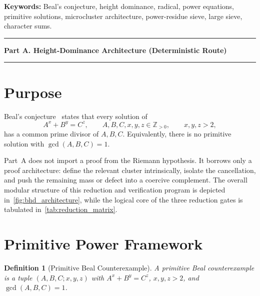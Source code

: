 \documentclass[11pt,a4paper]{article}
\newtheorem{definition}[theorem]{Definition}
\begin{document}
\begin{abstract}
Version 1.1 corrects the genus and regime classification, the null-row
direction and sieve domains, the scalar-family monodromy and strong-sum
claims, and the scope of the classical $(3,4,5)$ result. The elementary
$\Xi\ge\log4$ inequality provides no IUT/gcd bridge; historical diagnostic
scores and hard-coded gates provide no Beal exclusion. Numerical tables
remain historical diagnostics. HD3', typed transfers, explicit constants,
independent method validation and complete source/proof review remain open.
\end{abstract}

\noindent\textbf{Keywords:} Beal's conjecture, height dominance,
radical, power equations, primitive solutions, microcluster
architecture, power-residue sieve, large sieve, character sums.

\clearpage
\tableofcontents
\clearpage

\bigskip
\hrule
\medskip
\begin{center}
\textbf{Part A. Height-Dominance Architecture (Deterministic Route)}
\end{center}
\medskip
\hrule
\bigskip

\section{Purpose}

Beal's conjecture~\cite{Mauldin1997} states that every solution of
\[
  A^x + B^y = C^z,
  \qquad A,B,C,x,y,z \in \mathbb Z_{>0},
  \qquad x,y,z>2,
\]
has a common prime divisor of $A,B,C$. Equivalently, there is no
primitive solution with $\gcd(A,B,C)=1$.

Part~A does not import a proof from the Riemann hypothesis. It borrows
only a proof architecture: define the relevant cluster intrinsically,
isolate the cancellation, and push the remaining mass or defect into a
coercive complement. The overall modular structure of this reduction and
verification program is depicted in~\cref{fig:bhd_architecture}, while the
logical core of the three reduction gates is tabulated in~\cref{tab:reduction_matrix}.

\section{Primitive Power Framework}

\begin{definition}[Primitive Beal Counterexample]
A primitive Beal counterexample is a tuple $(A,B,C;x,y,z)$ with
$A^x+B^y=C^z$, $x,y,z>2$, and $\gcd(A,B,C)=1$.
\end{definition}
\end{document}
